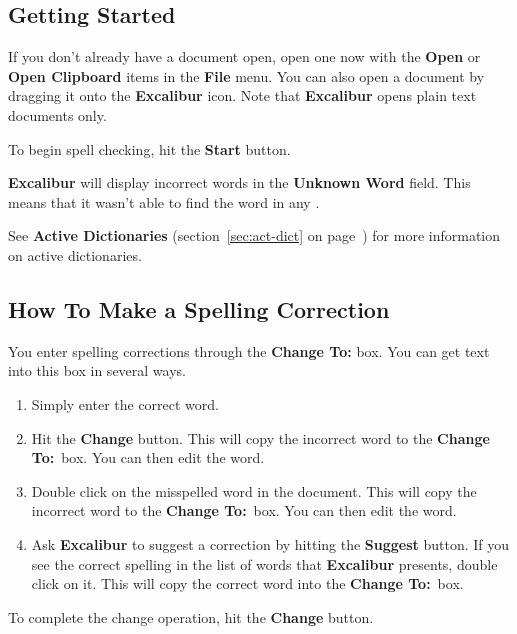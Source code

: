﻿\documentclass[11pt,titlepage]{article}
\newcommand{\ex}{\textbf{Excalibur}}
\begin{document}
\subsection{Getting Started}

If you don't already have a document open, open one now with the
\textbf{Open} or \textbf{Open Clipboard} items in the \textbf{File}
menu.  You can also open a document by dragging it onto the \ex{}
icon.  Note that \ex{} opens plain text documents only.

To begin spell checking, hit the \textbf{Start} button.

\ex{} will display incorrect words in the \textbf{Unknown Word} field.
This means that it wasn't able to find the word in any .
\begin{latexonly}
  See \textbf{Active Dictionaries} (section~\ref{sec:act-dict} on
  page~\pageref{sec:act-dict}) for more information on active
  dictionaries.
\end{latexonly}

\subsection{How To Make a Spelling Correction}

You enter spelling corrections through the \textbf{Change To:} box.
You can get text into this box in several ways.

\begin{enumerate}
\item Simply enter the correct word.

\item Hit the \textbf{Change} button. This will copy the incorrect
  word to the \textbf{Change To:}\ box. You can then edit the word.

\item Double click on the misspelled word in the document.  This will
  copy the incorrect word to the \textbf{Change To:}\ box.  You can
  then edit the word.

\item Ask \ex{} to suggest a correction by hitting the
  \textbf{Suggest} button. If you see the correct spelling in the list
  of words that \ex{} presents, double click on it. This will copy the
  correct word into the \textbf{Change To:}\ box.
\end{enumerate}

To complete the change operation, hit the \textbf{Change} button.
\end{document}
